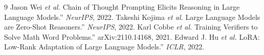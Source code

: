 \documentclass[11pt]{article}
\begin{document}
\begin{thebibliography}{9}
 Jason Wei \emph{et al.} Chain of Thought Prompting Elicits Reasoning in Large Language Models.'' \emph{NeurIPS}, 2022.
 Takeshi Kojima \emph{et al.} Large Language Models are Zero-Shot Reasoners.'' \emph{NeurIPS}, 2022.
 Karl Cobbe \emph{et al.} Training Verifiers to Solve Math Word Problems.'' arXiv:2110.14168, 2021.
 Edward J. Hu \emph{et al.} LoRA: Low-Rank Adaptation of Large Language Models.'' \emph{ICLR}, 2022.
\end{thebibliography}
\end{document}
